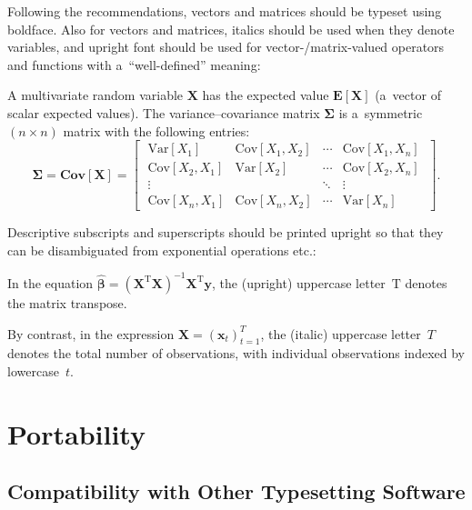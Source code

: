 \documentclass[12pt, a4paper, oneside]{article}
\renewcommand{\caps}[1]{{\textscale{0.97}{\textls[50]{\MakeUppercase{#1}}}}}
\theoremstyle{Plain}
\theoremstyle{Definition}
\theoremstyle{Remark}
\begin{document}
Following the \caps{ISO} recommendations, vectors and matrices should be typeset using boldface. Also for vectors and matrices, italics should be used when they denote variables, and upright font should be used for vector-\slash matrix-valued operators and functions with a~``well-defined'' meaning:
\begin{tcolorbox}[extras last = {bottom = -3.5ex}, extras unbroken = {bottom = -3.5ex}]
	A multivariate random variable $\bm{X}$ has the expected value $\mathbf{E}[\boldsymbol{X}]$ (a~vector of scalar expected values). The variance--covariance matrix $\bm{\Sigma}$ is a~symmetric ${(n \times n)}$ matrix with the following entries:
	\begin{equation}
		\bm{\Sigma} = \mathbf{Cov}[\bm{X}] =
		\left[\;\begin{matrix}
			\mathrm{Var}[X_1] & \mathrm{Cov}[X_1, X_2] & \cdots & \mathrm{Cov}[X_1, X_n] \\
			\mathrm{Cov}[X_2, X_1] & \mathrm{Var}[X_2] & \cdots & \mathrm{Cov}[X_2, X_n]
			\\
			\vdots & & \ddots & \vdots \\
			\mathrm{Cov}[X_n, X_1] & \mathrm{Cov}[X_n, X_2] & \cdots & \mathrm{Var}[X_n]
		\end{matrix}\;\right].
	\end{equation}
\end{tcolorbox}

Descriptive subscripts and superscripts should be printed upright so that they can be disambiguated from exponential operations etc.:
\begin{tcolorbox}
	In the equation ${\hat{\bm{\beta}} = (\bm{X}^\mathrm{T}\bm{X})^{-1}\bm{X}^\mathrm{T}\bm{y}}$, the (upright) uppercase letter~$\mathrm{T}$ denotes the matrix transpose. \par
	By contrast, in the expression ${\bm{X} = (\bm{x}_t)_{t = 1}^T}$, the (italic) uppercase letter~$T$ denotes the total number of observations, with individual observations indexed by lowercase~$t$.
\end{tcolorbox}


\section{Portability}

\subsection{Compatibility with Other Typesetting Software}
\label{sec:portability:compatibility}
\end{document}

